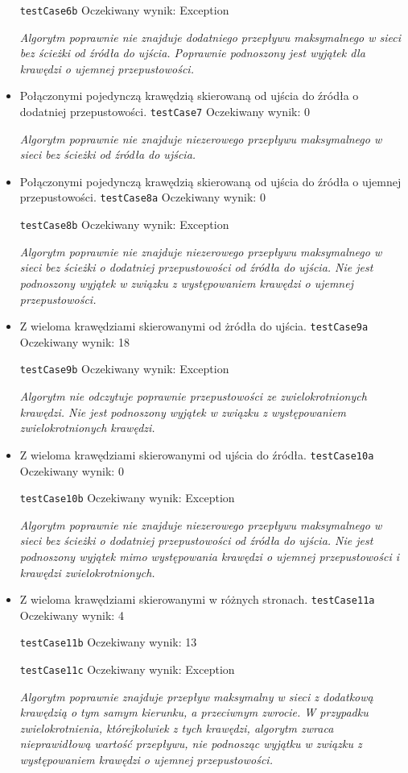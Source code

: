 \begin{itemize}[nosep]
    \texttt{testCase6b}
    Oczekiwany wynik: Exception

    \emph{Algorytm poprawnie nie znajduje
    dodatniego przepływu maksymalnego w sieci bez ścieżki od źródła do ujścia. Poprawnie
    podnoszony jest wyjątek dla krawędzi o ujemnej przepustowości.}

    \item Połączonymi pojedynczą krawędzią skierowaną od ujścia do źródła o dodatniej przepustowości.
    \texttt{testCase7}
    Oczekiwany wynik: 0

    \emph{Algorytm poprawnie nie znajduje niezerowego
    przepływu maksymalnego w sieci bez ścieżki od źródła do ujścia.}

    \item Połączonymi pojedynczą krawędzią skierowaną od ujścia do źródła o ujemnej przepustowości.
    \texttt{testCase8a}
    Oczekiwany wynik: 0

    \texttt{testCase8b}
    Oczekiwany wynik: Exception

    \emph{Algorytm poprawnie nie znajduje
    niezerowego przepływu maksymalnego w sieci bez ścieżki o dodatniej
    przepustowości od źródła do ujścia. Nie jest podnoszony wyjątek
    w związku z występowaniem krawędzi o ujemnej przepustowości.}

    \item Z wieloma krawędziami skierowanymi od żródła do ujścia.
    \texttt{testCase9a}
    Oczekiwany wynik: 18

    \texttt{testCase9b}
    Oczekiwany wynik: Exception

    \emph{Algorytm nie odczytuje
    poprawnie przepustowości ze zwielokrotnionych krawędzi. Nie jest
    podnoszony wyjątek w związku z występowaniem zwielokrotnionych krawędzi.}

    \item Z wieloma krawędziami skierowanymi od ujścia do źródła.
    \texttt{testCase10a}
    Oczekiwany wynik: 0

    \texttt{testCase10b}
    Oczekiwany wynik: Exception

    \emph{Algorytm poprawnie
    nie znajduje niezerowego przepływu maksymalnego w sieci bez ścieżki
    o dodatniej przepustowości od źródła do ujścia. Nie jest podnoszony
    wyjątek mimo występowania krawędzi o ujemnej przepustowości i krawędzi
    zwielokrotnionych.}

    \item Z wieloma krawędziami skierowanymi w różnych stronach.
    \texttt{testCase11a}
    Oczekiwany wynik: 4

    \texttt{testCase11b}
    Oczekiwany wynik: 13

    \texttt{testCase11c}
    Oczekiwany wynik: Exception

    \emph{Algorytm poprawnie znajduje przepływ maksymalny w sieci z dodatkową krawędzią
    o tym samym kierunku, a przeciwnym zwrocie. W przypadku zwielokrotnienia,
    którejkolwiek z tych krawędzi, algorytm zwraca nieprawidłową wartość
    przepływu, nie podnosząc wyjątku w związku z występowaniem krawędzi
    o ujemnej przepustowości.}

\end{itemize}


